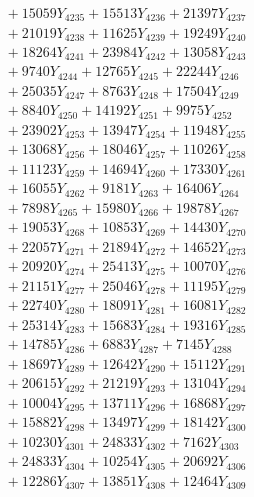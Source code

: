 \documentclass[a4paper,10pt]{article}
\begin{document}
{\begin{align}
&\;  + 15059 Y_{4235} + 15513 Y_{4236} + 21397 Y_{4237} \\[0.3ex]
&\;  + 21019 Y_{4238} + 11625 Y_{4239} + 19249 Y_{4240} \\[0.3ex]
&\;  + 18264 Y_{4241} + 23984 Y_{4242} + 13058 Y_{4243} \\[0.3ex]
&\;  + 9740 Y_{4244} + 12765 Y_{4245} + 22244 Y_{4246} \\[0.3ex]
&\;  + 25035 Y_{4247} + 8763 Y_{4248} + 17504 Y_{4249} \\[0.3ex]
&\;  + 8840 Y_{4250} + 14192 Y_{4251} + 9975 Y_{4252} \\[0.3ex]
&\;  + 23902 Y_{4253} + 13947 Y_{4254} + 11948 Y_{4255} \\[0.3ex]
&\;  + 13068 Y_{4256} + 18046 Y_{4257} + 11026 Y_{4258} \\[0.5ex]\allowbreak
&\;  + 11123 Y_{4259} + 14694 Y_{4260} + 17330 Y_{4261} \\[0.3ex]
&\;  + 16055 Y_{4262} + 9181 Y_{4263} + 16406 Y_{4264} \\[0.3ex]
&\;  + 7898 Y_{4265} + 15980 Y_{4266} + 19878 Y_{4267} \\[0.3ex]
&\;  + 19053 Y_{4268} + 10853 Y_{4269} + 14430 Y_{4270} \\[0.3ex]
&\;  + 22057 Y_{4271} + 21894 Y_{4272} + 14652 Y_{4273} \\[0.3ex]
&\;  + 20920 Y_{4274} + 25413 Y_{4275} + 10070 Y_{4276} \\[0.3ex]
&\;  + 21151 Y_{4277} + 25046 Y_{4278} + 11195 Y_{4279} \\[0.3ex]
&\;  + 22740 Y_{4280} + 18091 Y_{4281} + 16081 Y_{4282} \\[0.3ex]
&\;  + 25314 Y_{4283} + 15683 Y_{4284} + 19316 Y_{4285} \\[0.3ex]
&\;  + 14785 Y_{4286} + 6883 Y_{4287} + 7145 Y_{4288} \\[0.5ex]\allowbreak
&\;  + 18697 Y_{4289} + 12642 Y_{4290} + 15112 Y_{4291} \\[0.3ex]
&\;  + 20615 Y_{4292} + 21219 Y_{4293} + 13104 Y_{4294} \\[0.3ex]
&\;  + 10004 Y_{4295} + 13711 Y_{4296} + 16868 Y_{4297} \\[0.3ex]
&\;  + 15882 Y_{4298} + 13497 Y_{4299} + 18142 Y_{4300} \\[0.3ex]
&\;  + 10230 Y_{4301} + 24833 Y_{4302} + 7162 Y_{4303} \\[0.3ex]
&\;  + 24833 Y_{4304} + 10254 Y_{4305} + 20692 Y_{4306} \\[0.3ex]
&\;  + 12286 Y_{4307} + 13851 Y_{4308} + 12464 Y_{4309} \\[0.3ex]

\end{align}}
\end{document}
